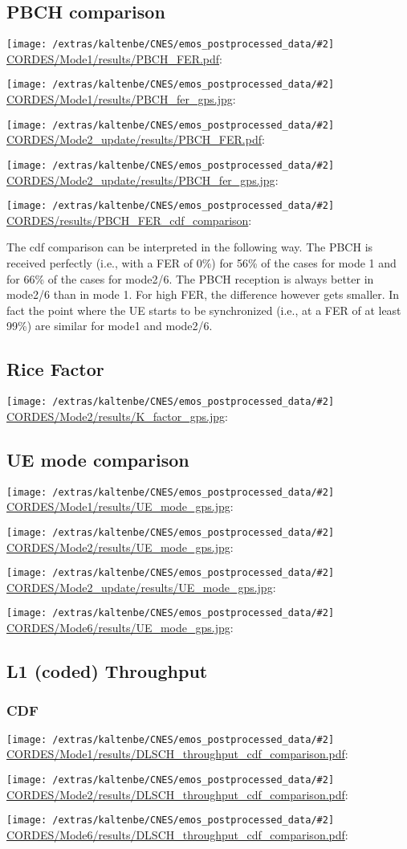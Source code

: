 \documentclass[a4paper,10pt]{article}
\newcommand{\printfile}[2][]{
 \begin{minipage}{8cm}
  \centering
  \texttt{[image: /extras/kaltenbe/CNES/emos\_postprocessed\_data/\#2]}
  \url{#2}: #1

 \end{minipage}
}
\begin{document}
\subsection{PBCH comparison}

\printfile{CORDES/Mode1/results/PBCH_FER.pdf}
\printfile{CORDES/Mode1/results/PBCH_fer_gps.jpg}

\printfile{CORDES/Mode2_update/results/PBCH_FER.pdf}
\printfile{CORDES/Mode2_update/results/PBCH_fer_gps.jpg}

\printfile{CORDES/results/PBCH_FER_cdf_comparison}

The cdf comparison can be interpreted in the following way. The PBCH is received perfectly (i.e., with a FER of 0\%) for 56\% of the cases for mode 1 and for 66\% of the cases for mode2/6. The PBCH reception is always better in mode2/6 than in mode 1. For high FER, the difference however gets smaller. In fact the point where the UE starts to be synchronized (i.e., at a FER of at least 99\%) are similar for mode1 and mode2/6. 

\subsection{Rice Factor}

\printfile{CORDES/Mode2/results/K_factor_gps.jpg}

\subsection{UE mode comparison}

\printfile{CORDES/Mode1/results/UE_mode_gps.jpg}
\printfile{CORDES/Mode2/results/UE_mode_gps.jpg}

\printfile{CORDES/Mode2_update/results/UE_mode_gps.jpg}
\printfile{CORDES/Mode6/results/UE_mode_gps.jpg}

\subsection{L1 (coded) Throughput}


\subsubsection{CDF}

\printfile{CORDES/Mode1/results/DLSCH_throughput_cdf_comparison.pdf}
\printfile{CORDES/Mode2/results/DLSCH_throughput_cdf_comparison.pdf}

\printfile{CORDES/Mode6/results/DLSCH_throughput_cdf_comparison.pdf}
\end{document}
